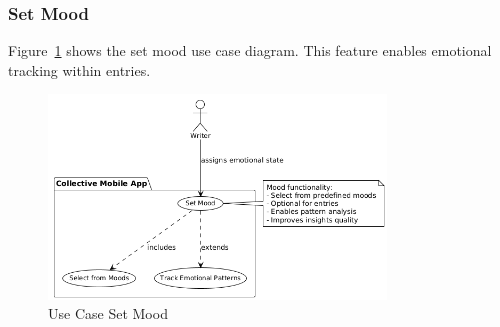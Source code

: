 \subsubsection{Set Mood}

Figure~\ref{fig:usecase-set-mood} shows the set mood use case diagram. This feature enables emotional tracking within entries.

\begin{figure}[H]
\centering
\includegraphics[width=0.8\textwidth]{files/imgs/usecase_U9ojKarFma.png}
\caption{Use Case Set Mood}
\label{fig:usecase-set-mood}
\end{figure}

